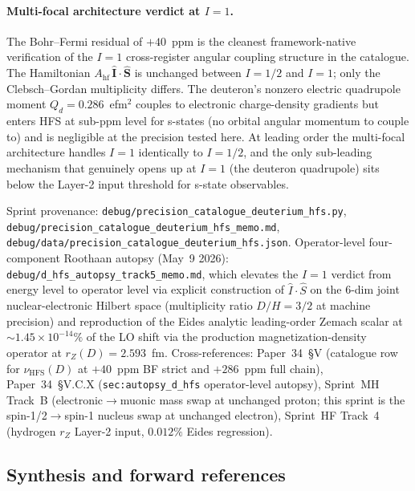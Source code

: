 \documentclass[twocolumn,prc,amsmath,amssymb,superscriptaddress]{revtex4-2}
\begin{document}
\paragraph{Multi-focal architecture verdict at $I=1$.}
The Bohr--Fermi residual of $+40$~ppm is the cleanest framework-native
verification of the $I=1$ cross-register angular coupling structure
in the catalogue. The Hamiltonian
$A_\text{hf}\,\hat{\mathbf{I}}\cdot\hat{\mathbf{S}}$ is unchanged
between $I=1/2$ and $I=1$; only the Clebsch--Gordan multiplicity
differs. The deuteron's nonzero electric quadrupole moment
$Q_d = 0.286$~efm$^2$ couples to electronic charge-density gradients
but enters HFS at sub-ppm level for s-states (no orbital angular
momentum to couple to) and is negligible at the precision tested here.
At leading order the multi-focal architecture handles $I=1$ identically
to $I=1/2$, and the only sub-leading mechanism that genuinely opens up
at $I=1$ (the deuteron quadrupole) sits below the Layer-2 input
threshold for s-state observables.

Sprint provenance:
\texttt{debug/precision\_catalogue\_deuterium\_hfs.py},
\texttt{debug/precision\_catalogue\_deuterium\_hfs\_memo.md},
\texttt{debug/data/precision\_catalogue\_deuterium\_hfs.json}.
Operator-level four-component Roothaan autopsy
(May~9 2026): \texttt{debug/d\_hfs\_autopsy\_track5\_memo.md}, which
elevates the $I=1$ verdict from energy level to operator level via
explicit construction of $\hat{I}\cdot\hat{S}$ on the 6-dim joint
nuclear-electronic Hilbert space (multiplicity ratio
$D/H = 3/2$ at machine precision) and reproduction of the Eides analytic
leading-order Zemach scalar at $\sim 1.45 \times 10^{-14}\%$ of the
LO shift via the production magnetization-density operator at
$r_Z(D) = 2.593$~fm.
Cross-references: Paper~34~\S V (catalogue row for $\nu_\text{HFS}(D)$
at $+40$~ppm BF strict and $+286$~ppm full chain), Paper~34~\S V.C.X
(\texttt{sec:autopsy\_d\_hfs} operator-level autopsy),
Sprint~MH Track~B (electronic$\to$muonic mass swap at unchanged
proton; this sprint is the spin-1/2$\to$spin-1 nucleus swap at
unchanged electron), Sprint~HF Track~4 (hydrogen $r_Z$ Layer-2 input,
$0.012\%$ Eides regression).

\subsection{Synthesis and forward references}
\label{ssec:cross-synthesis}
\end{document}
